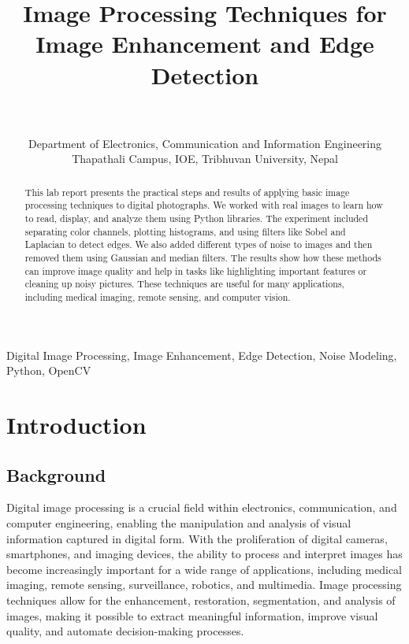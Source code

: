 \documentclass[a4paper, journal]{IEEEtran}
\begin{document}
\title{Image Processing Techniques for Image Enhancement and Edge Detection}
\author{
   \\
   \quad \\
  Department of Electronics, Communication and Information Engineering\\
  Thapathali Campus, IOE, Tribhuvan University, Nepal\\
}

\maketitle

\begin{abstract}
  This lab report presents the practical steps and results of applying basic image processing techniques to digital photographs. We worked with real images to learn how to read, display, and analyze them using Python libraries. The experiment included separating color channels, plotting histograms, and using filters like Sobel and Laplacian to detect edges. We also added different types of noise to images and then removed them using Gaussian and median filters. The results show how these methods can improve image quality and help in tasks like highlighting important features or cleaning up noisy pictures. These techniques are useful for many applications, including medical imaging, remote sensing, and computer vision.
\end{abstract}
\begin{IEEEkeywords}
  Digital Image Processing, Image Enhancement, Edge Detection, Noise Modeling, Python, OpenCV
\end{IEEEkeywords}

\section{Introduction}
\subsection{Background}

Digital image processing is a crucial field within electronics, communication, and computer engineering, enabling the manipulation and analysis of visual information captured in digital form. With the proliferation of digital cameras, smartphones, and imaging devices, the ability to process and interpret images has become increasingly important for a wide range of applications, including medical imaging, remote sensing, surveillance, robotics, and multimedia. Image processing techniques allow for the enhancement, restoration, segmentation, and analysis of images, making it possible to extract meaningful information, improve visual quality, and automate decision-making processes.
\end{document}

